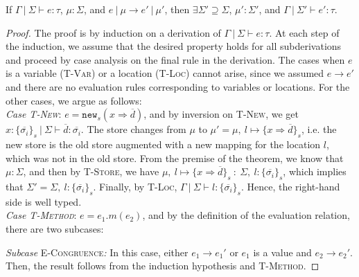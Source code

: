 \documentclass{llncs}
\newcommand{\keywadj}[1]{\mathtt{#1}}
\begin{document}
\vspace{6pt}

\begin{theorem}[Preservation]
If $\Gamma~|~\Sigma \vdash e : \tau$, $\mu : \Sigma$, and $e~|~\mu \longrightarrow e'~|~\mu'$, then $\exists \Sigma' \supseteq \Sigma$, $\mu' : \Sigma'$, and $\Gamma~|~\Sigma' \vdash e' : \tau$.

\end{theorem}

\begin{proof} The proof is by induction on a derivation of $\Gamma~|~\Sigma \vdash e : \tau$. At each step of the induction, we assume that the desired property holds for all subderivations and proceed by case analysis on the final rule in the derivation. The cases when $e$ is a variable (\textsc{T-Var}) or a location (\textsc{T-Loc}) cannot arise, since we assumed $e \longrightarrow e'$ and there are no evaluation rules corresponding to variables or locations. For the other cases, we argue as follows:
\\

\noindent\textit{Case \textsc{T-New}}:
$e = \keywadj{new}_{s}(x \Rightarrow \overline{d})$, and by inversion on \textsc{T-New}, we get $x : \{ \overline{\sigma_i} \}_{s}~|~\Sigma \vdash \overline{d} : \overline{\sigma_i}$. The store changes from $\mu$ to $\mu' = \mu,~l \mapsto \{ x \Rightarrow \overline{d} \}_s$, i.e. the new store is the old store augmented with a new mapping for the location $l$, which was not in the old store. From the premise of the theorem, we know that $\mu : \Sigma$, and then by \textsc{T-Store}, we have $\mu,~l \mapsto \{ x \Rightarrow \overline{d} \}_s~:~\Sigma,~l : \{ \overline{\sigma_i} \}_s$, which implies that $\Sigma' = \Sigma,~l : \{ \overline{\sigma_i} \}_s$. Finally, by \textsc{T-Loc}, $\Gamma~|~\Sigma \vdash l : \{ \overline{\sigma_i} \}_s$. Hence, the right-hand side is well typed.
\\

\noindent\textit{Case \textsc{T-Method}}:
$e = e_1.m(e_2)$, and by the definition of the evaluation relation, there are two subcases:

\textit{Subcase} \textsc{E-Congruence}\textit{:} In this case, either $e_1 \longrightarrow e_1'$ or $e_1$ is a value and $e_2 \longrightarrow e_2'$. Then, the result follows from the induction hypothesis and \textsc{T-Method}.


\end{proof}
\end{document}
